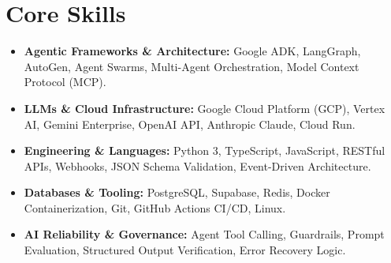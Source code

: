 \documentclass[a4paper,10pt]{article}
\begin{document}
\section{Core Skills}
\begin{itemize}
  \item \textbf{Agentic Frameworks \& Architecture:} Google ADK, LangGraph, AutoGen, Agent Swarms, Multi-Agent Orchestration, Model Context Protocol (MCP).
  \item \textbf{LLMs \& Cloud Infrastructure:} Google Cloud Platform (GCP), Vertex AI, Gemini Enterprise, OpenAI API, Anthropic Claude, Cloud Run.
  \item \textbf{Engineering \& Languages:} Python 3, TypeScript, JavaScript, RESTful APIs, Webhooks, JSON Schema Validation, Event-Driven Architecture.
  \item \textbf{Databases \& Tooling:} PostgreSQL, Supabase, Redis, Docker Containerization, Git, GitHub Actions CI/CD, Linux.
  \item \textbf{AI Reliability \& Governance:} Agent Tool Calling, Guardrails, Prompt Evaluation, Structured Output Verification, Error Recovery Logic.
\end{itemize}
\end{document}
